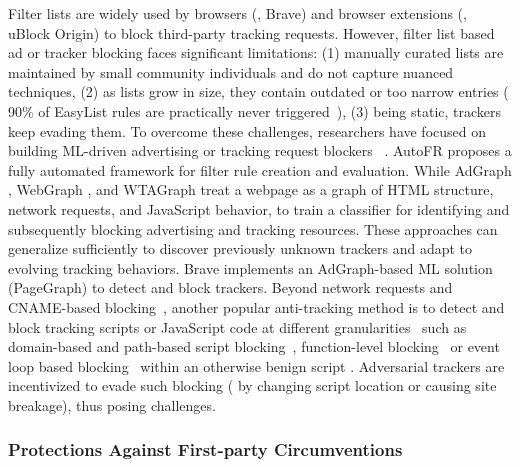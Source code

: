 Filter lists are widely used by browsers (\eg{}, Brave) and browser extensions (\eg{}, uBlock Origin) to block third-party tracking requests.
%
However, filter list based ad or tracker blocking faces significant limitations: 
%
(1) manually curated lists are maintained by small community individuals and do not capture nuanced techniques, 
%
(2) as lists grow in size, they contain outdated or too narrow entries (\eg{} 90\% of EasyList rules are practically never triggered~\cite{snyderWhoFiltersFilters2020}),
%
(3) being static, trackers keep evading them.
%
To overcome these challenges, researchers have focused on building ML-driven advertising or tracking request blockers ~\cite{iqbalAdGraphGraphBasedApproach2020, sibyWebGraphCapturingAdvertising2022, yangWTAGRAPHWebTracking2022, leAutoFRAutomatedFilter2023}.
%
AutoFR \cite{leAutoFRAutomatedFilter2023} proposes a fully automated framework for filter rule creation and evaluation.
%
While AdGraph \cite{iqbalAdGraphGraphBasedApproach2020}, WebGraph \cite{sibyWebGraphCapturingAdvertising2022}, and WTAGraph \cite{yangWTAGRAPHWebTracking2022} treat a webpage as a graph of HTML structure, network requests, and JavaScript behavior, to train a classifier for identifying and subsequently blocking advertising and tracking resources.
%
These approaches can generalize sufficiently to discover previously unknown trackers and adapt to evolving tracking behaviors. 
%
Brave implements an AdGraph-based ML solution (PageGraph) to detect and block trackers.
%
Beyond network requests and CNAME-based blocking~\cite{daoCNAMECloakingBasedTracking2021}, another popular anti-tracking method is to detect and block tracking scripts or JavaScript code at different granularities~\cite{ikramSeamlessTrackingFreeWeb2017,smithSugarCoatProgrammaticallyGenerating2021} such as domain-based and path-based script blocking~\cite{leCVInspectorAutomatingDetection2021,alrizahErrorsMisunderstandingsAttacks2019,snyderWhoFiltersFilters2020}, function-level blocking~\cite{amjadBlockingJavaScriptBreaking2023,amjadBlockingTrackingJavaScript2024} or event loop based blocking~\cite{chenDetectingFilterList2021} within an otherwise benign script \cite{amjadTrackerSiftUntanglingMixed2021}. %
Adversarial trackers are incentivized to evade such blocking (\eg{} by changing script location or causing site breakage), thus posing challenges.



\subsubsection{Protections Against First-party Circumventions}

